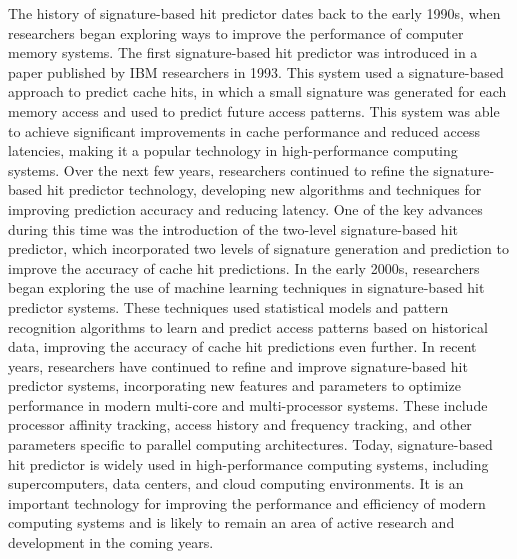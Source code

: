  The history of signature-based hit predictor dates back to the early 1990s, when researchers began exploring ways to improve the performance of computer memory systems. The first signature-based hit predictor was introduced in a paper published by IBM researchers in 1993. This system used a signature-based approach to predict cache hits, in which a small signature was generated for each memory access and used to predict future access patterns. This system was able to achieve significant improvements in cache performance and reduced access latencies, making it a popular technology in high-performance computing systems.\cite{Samira} Over the next few years, researchers continued to refine the signature-based hit predictor technology, developing new algorithms and techniques for improving prediction accuracy and reducing latency. One of the key advances during this time was the introduction of the two-level signature-based hit predictor, which incorporated two levels of signature generation and prediction to improve the accuracy of cache hit predictions. In the early 2000s, researchers began exploring the use of machine learning techniques in signature-based hit predictor systems. These techniques used statistical models and pattern recognition algorithms to learn and predict access patterns based on historical data, improving the accuracy of cache hit predictions even further. In recent years, researchers have continued to refine and improve signature-based hit predictor systems, incorporating new features and parameters to optimize performance in modern multi-core and multi-processor systems. These include processor affinity tracking, access history and frequency tracking, and other parameters specific to parallel computing architectures. Today, signature-based hit predictor is widely used in high-performance computing systems, including supercomputers, data centers, and cloud computing environments.\cite{Wu2011} It is an important technology for improving the performance and efficiency of modern computing systems and is likely to remain an area of active research and development in the coming years.

